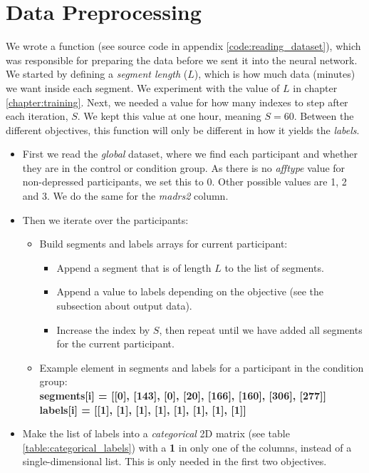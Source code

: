 \section{Data Preprocessing}
\label{section:data_preprocessing}

We wrote a function (see source code in appendix \ref{code:reading_dataset}), which was responsible for preparing the data before we sent it into the neural network. We started by defining a \textit{segment length} ($L$), which is how much data (minutes) we want inside each segment. We experiment with the value of $L$ in chapter \ref{chapter:training}. Next, we needed a value for how many indexes to step after each iteration, $S$. We kept this value at one hour, meaning $S=60$. Between the different objectives, this function will only be different in how it yields the \textit{labels}.

\begin{itemize}
  \item First we read the \textit{global} dataset, where we find each participant and whether they are in the control or condition group. As there is no \textit{afftype} value for non-depressed participants, we set this to 0. Other possible values are 1, 2 and 3. We do the same for the \textit{madrs2} column.
  \item Then we iterate over the participants:

  \begin{itemize}
    \item Build segments and labels arrays for current participant:
    \begin{itemize}
      \item Append a segment that is of length $L$ to the list of segments. 
      \item Append a value to labels depending on the objective (see the subsection about output data).
      \item Increase the index by $S$, then repeat until we have added all segments for the current participant.
    \end{itemize}
    \item Example element in segments and labels for a participant in the condition group: \\
    \textbf{segments[i] = [[0], [143], [0], [20], [166], [160], [306], [277]]}\\
    \textbf{labels[i] = [[1], [1], [1], [1], [1], [1], [1], [1]]}
  \end{itemize}
  
  \item Make the list of labels into a \textit{categorical} 2D matrix (see table \ref{table:categorical_labels}) with a \textbf{1} in only one of the columns, instead of a single-dimensional list. This is only needed in the first two objectives.
\end{itemize}

